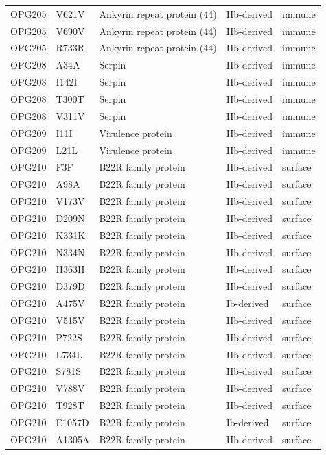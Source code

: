 \documentclass[11pt]{article}
\begin{document}
\begin{longtable}{lllll}
OPG205 & V621V & Ankyrin repeat protein (44) & IIb-derived & immune \\
OPG205 & V690V & Ankyrin repeat protein (44) & IIb-derived & immune \\
OPG205 & R733R & Ankyrin repeat protein (44) & IIb-derived & immune \\
OPG208 & A34A & Serpin & IIb-derived & immune \\
OPG208 & I142I & Serpin & IIb-derived & immune \\
OPG208 & T300T & Serpin & IIb-derived & immune \\
OPG208 & V311V & Serpin & IIb-derived & immune \\
OPG209 & I11I & Virulence protein & IIb-derived & immune \\
OPG209 & L21L & Virulence protein & IIb-derived & immune \\
OPG210 & F3F & B22R family protein & IIb-derived & surface \\
OPG210 & A98A & B22R family protein & IIb-derived & surface \\
OPG210 & V173V & B22R family protein & IIb-derived & surface \\
OPG210 & D209N & B22R family protein & IIb-derived & surface \\
OPG210 & K331K & B22R family protein & IIb-derived & surface \\
OPG210 & N334N & B22R family protein & IIb-derived & surface \\
OPG210 & H363H & B22R family protein & IIb-derived & surface \\
OPG210 & D379D & B22R family protein & IIb-derived & surface \\
OPG210 & A475V & B22R family protein & Ib-derived & surface \\
OPG210 & V515V & B22R family protein & IIb-derived & surface \\
OPG210 & P722S & B22R family protein & IIb-derived & surface \\
OPG210 & L734L & B22R family protein & IIb-derived & surface \\
OPG210 & S781S & B22R family protein & IIb-derived & surface \\
OPG210 & V788V & B22R family protein & IIb-derived & surface \\
OPG210 & T928T & B22R family protein & IIb-derived & surface \\
OPG210 & E1057D & B22R family protein & Ib-derived & surface \\
OPG210 & A1305A & B22R family protein & IIb-derived & surface \\

\end{longtable}
\end{document}
